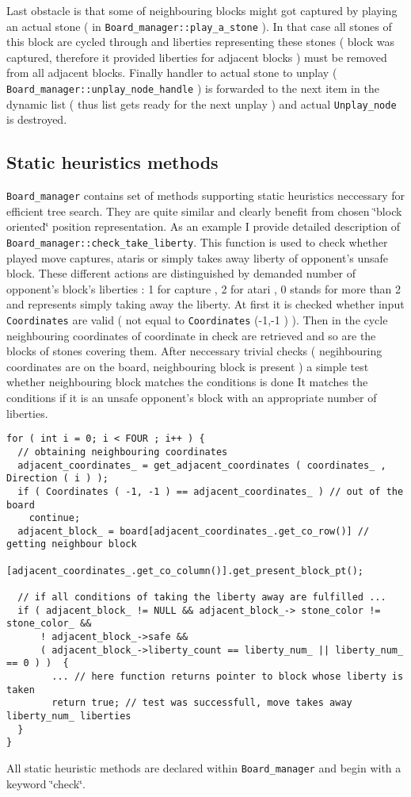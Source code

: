 Last obstacle is that some of neighbouring blocks might got captured by playing an actual stone ( in {\tt Board\_\-manager::play\_\-a\_\-stone} ). In that case all stones of this block are cycled through and liberties representing these stones ( block was captured, therefore it provided liberties for adjacent blocks ) must be removed from all adjacent blocks. Finally handler to actual stone to unplay ( {\tt Board\_\-manager::unplay\_\-node\_\-handle} ) is forwarded to the next item in the dynamic list ( thus list gets ready for the next unplay ) and actual {\tt Unplay\_\-node} is destroyed.\subsection{Static heuristics methods}\label{page_6_page_6__sec_5}
{\tt Board\_\-manager} contains set of methods supporting static heuristics neccessary for efficient tree search. They are quite similar and clearly benefit from chosen \char`\"{}block oriented\char`\"{} position representation. As an example I provide detailed description of {\tt Board\_\-manager::check\_\-take\_\-liberty}. This function is used to check whether played move captures, ataris or simply takes away liberty of opponent's unsafe block. These different actions are distinguished by demanded number of opponent's block's liberties : 1 for capture , 2 for atari , 0 stands for more than 2 and represents simply taking away the liberty. At first it is checked whether input {\tt Coordinates} are valid ( not equal to {\tt Coordinates} (-1,-1 ) ). Then in the cycle neighbouring coordinates of coordinate in check are retrieved and so are the blocks of stones covering them. After neccessary trivial checks ( negihbouring coordinates are on the board, neighbouring block is present ) a simple test whether neighbouring block matches the conditions is done It matches the conditions if it is an unsafe opponent's block with an appropriate number of liberties.



\footnotesize\begin{verbatim}for ( int i = 0; i < FOUR ; i++ ) {
  // obtaining neighbouring coordinates 
  adjacent_coordinates_ = get_adjacent_coordinates ( coordinates_ , Direction ( i ) ); 
  if ( Coordinates ( -1, -1 ) == adjacent_coordinates_ ) // out of the board
    continue;
  adjacent_block_ = board[adjacent_coordinates_.get_co_row()] // getting neighbour block
                         [adjacent_coordinates_.get_co_column()].get_present_block_pt();

  // if all conditions of taking the liberty away are fulfilled ...
  if ( adjacent_block_ != NULL && adjacent_block_-> stone_color != stone_color_ && 
      ! adjacent_block_->safe &&    
      ( adjacent_block_->liberty_count == liberty_num_ || liberty_num_ == 0 ) )  { 
        ... // here function returns pointer to block whose liberty is taken 
        return true; // test was successfull, move takes away liberty_num_ liberties
  }
}
\end{verbatim}
\normalsize


All static heuristic methods are declared within {\tt Board\_\-manager} and begin with a keyword \char`\"{}check\char`\"{}. 